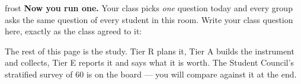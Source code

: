 \documentclass[10pt]{article}
\begin{document}

\vspace{0.15in}

\begin{headlinebox}{frost}
\small
\textbf{Now you run one.} Your class picks \emph{one} question today and every
group asks the same question of every student in this room. Write your class
question here, exactly as the class agreed to it:

\vspace{4pt}

\vspace{2pt}
The rest of this page is the study. Tier R plans it, Tier A builds the
instrument and collects, Tier E reports it and says what it is worth. The
Student Council's stratified survey of $60$ is on the board --- you will
compare against it at the end.
\end{headlinebox}

\vspace{0.03in}
\end{document}
